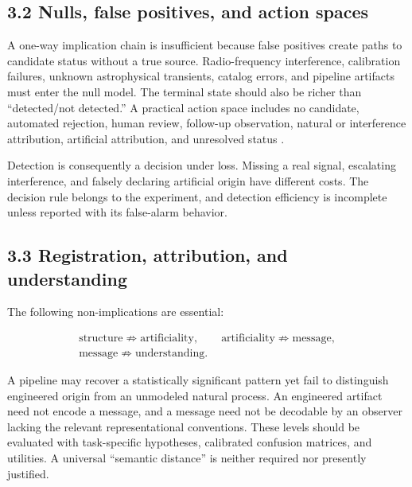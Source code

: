 \documentclass[11pt,a4paper]{article}
\begin{document}
\subsection{3.2 Nulls, false positives, and action spaces}\label{32-nulls-false-positives-and-action-spaces}

A one-way implication chain is insufficient because false positives create paths to candidate status without a true source. Radio-frequency interference, calibration failures, unknown astrophysical transients, catalog errors, and pipeline artifacts must enter the null model. The terminal state should also be richer than ``detected/not detected.'' A practical action space includes no candidate, automated rejection, human review, follow-up observation, natural or interference attribution, artificial attribution, and unresolved status \citep{sheikh2021}.

Detection is consequently a decision under loss. Missing a real signal, escalating interference, and falsely declaring artificial origin have different costs. The decision rule belongs to the experiment, and detection efficiency is incomplete unless reported with its false-alarm behavior.

\subsection{3.3 Registration, attribution, and understanding}\label{33-registration-attribution-and-understanding}

The following non-implications are essential:

\begin{equation}
\begin{gathered}
\text{structure}\not\Rightarrow\text{artificiality},\qquad
\text{artificiality}\not\Rightarrow\text{message},\\
\text{message}\not\Rightarrow\text{understanding}.
\end{gathered}
\end{equation}

A pipeline may recover a statistically significant pattern yet fail to distinguish engineered origin from an unmodeled natural process. An engineered artifact need not encode a message, and a message need not be decodable by an observer lacking the relevant representational conventions. These levels should be evaluated with task-specific hypotheses, calibrated confusion matrices, and utilities. A universal ``semantic distance'' is neither required nor presently justified.
\end{document}
